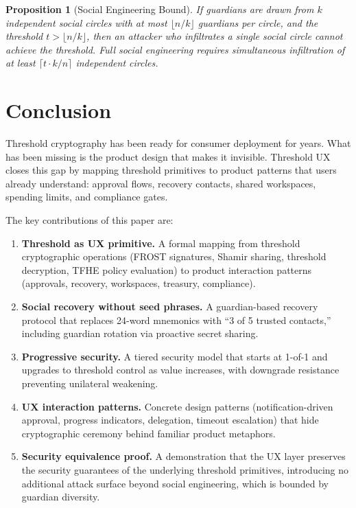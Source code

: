 \documentclass[11pt,a4paper]{article}
\newtheorem{proposition}[theorem]{Proposition}
\begin{document}
\begin{proposition}[Social Engineering Bound]
If guardians are drawn from $k$ independent social circles with at most
$\lfloor n/k \rfloor$ guardians per circle, and the threshold $t > \lfloor n/k \rfloor$,
then an attacker who infiltrates a single social circle cannot achieve
the threshold. Full social engineering requires simultaneous infiltration
of at least $\lceil t \cdot k / n \rceil$ independent circles.
\end{proposition}

\section{Conclusion}\label{sec:conclusion}

Threshold cryptography has been ready for consumer deployment for years.
What has been missing is the product design that makes it invisible.
Threshold UX closes this gap by mapping threshold primitives to product
patterns that users already understand: approval flows, recovery contacts,
shared workspaces, spending limits, and compliance gates.

The key contributions of this paper are:

\begin{enumerate}
    \item \textbf{Threshold as UX primitive.} A formal mapping from
    threshold cryptographic operations (FROST signatures, Shamir sharing,
    threshold decryption, TFHE policy evaluation) to product interaction
    patterns (approvals, recovery, workspaces, treasury, compliance).

    \item \textbf{Social recovery without seed phrases.} A guardian-based
    recovery protocol that replaces 24-word mnemonics with ``3 of 5 trusted
    contacts,'' including guardian rotation via proactive secret sharing.

    \item \textbf{Progressive security.} A tiered security model that
    starts at 1-of-1 and upgrades to threshold control as value increases,
    with downgrade resistance preventing unilateral weakening.

    \item \textbf{UX interaction patterns.} Concrete design patterns
    (notification-driven approval, progress indicators, delegation,
    timeout escalation) that hide cryptographic ceremony behind familiar
    product metaphors.

    \item \textbf{Security equivalence proof.} A demonstration that the
    UX layer preserves the security guarantees of the underlying threshold
    primitives, introducing no additional attack surface beyond social
    engineering, which is bounded by guardian diversity.
\end{enumerate}
\end{document}
